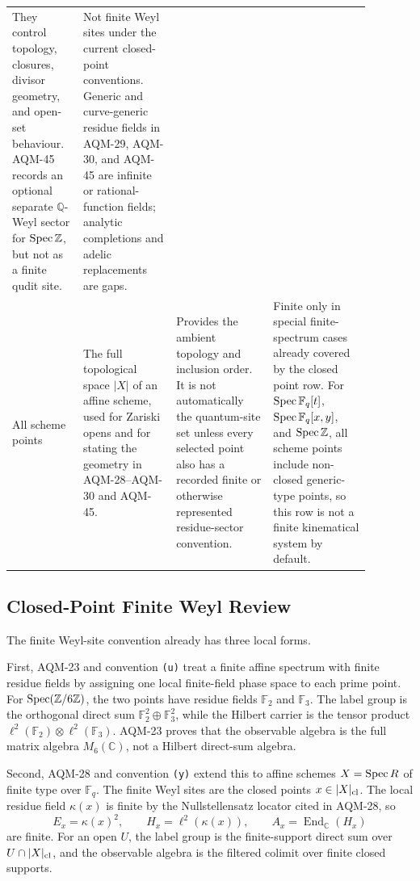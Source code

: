 \begin{center}
\begin{tabular}{p{0.17\linewidth}p{0.23\linewidth}p{0.24\linewidth}p{0.24\linewidth}}
They control topology, closures, divisor geometry, and open-set behaviour.
AQM-45 records an optional separate \(\mathbb Q\)-Weyl sector for
\(\operatorname{Spec}\mathbb Z\), but not as a finite qudit site. &
Not finite Weyl sites under the current closed-point conventions.  Generic
and curve-generic residue fields in AQM-29, AQM-30, and AQM-45 are infinite
or rational-function fields; analytic completions and adelic replacements are
gaps. \\
\addlinespace
All scheme points &
The full topological space \(|X|\) of an affine scheme, used for Zariski
opens and for stating the geometry in AQM-28--AQM-30 and AQM-45. &
Provides the ambient topology and inclusion order.  It is not automatically
the quantum-site set unless every selected point also has a recorded finite
or otherwise represented residue-sector convention. &
Finite only in special finite-spectrum cases already covered by the closed
point row.  For \(\operatorname{Spec}\mathbb F_q[t]\), \(\operatorname{Spec}\mathbb F_q[x,y]\), and
\(\operatorname{Spec}\mathbb Z\), all scheme points include non-closed generic-type points,
so this row is not a finite kinematical system by default. \\
\bottomrule
\end{tabular}
\end{center}

\subsection{Closed-Point Finite Weyl Review}

The finite Weyl-site convention already has three local forms.

First, AQM-23 and convention \texttt{(u)} treat a finite affine spectrum with
finite residue fields by assigning one local finite-field phase space to each
prime point.  For \(\operatorname{Spec}(\mathbb Z/6\mathbb Z)\), the two points have
residue fields \(\mathbb F_2\) and \(\mathbb F_3\).  The label group is the
orthogonal direct sum \(\mathbb F_2^2\oplus\mathbb F_3^2\), while the Hilbert
carrier is the tensor product \(\ell^2(\mathbb F_2)\otimes
\ell^2(\mathbb F_3)\).  AQM-23 proves that the observable algebra is the full
matrix algebra \(M_6(\mathbb C)\), not a Hilbert direct-sum algebra.

Second, AQM-28 and convention \texttt{(y)} extend this to affine schemes
\(X=\operatorname{Spec} R\) of finite type over \(\mathbb F_q\).  The finite Weyl sites are
the closed points \(x\in |X|_{\rm cl}\).  The local residue field
\(\kappa(x)\) is finite by the Nullstellensatz locator cited in AQM-28, so
\[
  E_x=\kappa(x)^2,\qquad
  H_x=\ell^2(\kappa(x)),\qquad
  A_x=\operatorname{End}_{\mathbb C}(H_x)
\]
are finite.  For an open \(U\), the label group is the finite-support direct
sum over \(U\cap |X|_{\rm cl}\), and the observable algebra is the filtered
colimit over finite closed supports.

